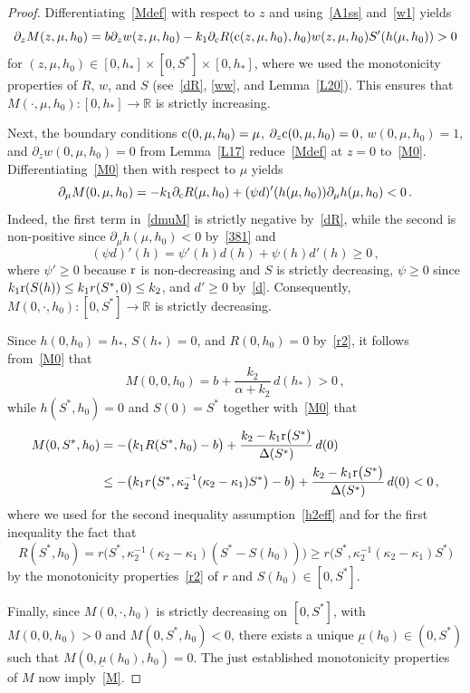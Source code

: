 \documentclass[reqno,11pt]{amsart}
\numberwithin{equation}{section}
\newcommand{\R}{\mathbb{R}}
\begin{document}
\begin{proof}
Differentiating~\eqref{Mdef} with respect to $z$ and using~\eqref{A1ss} and~\eqref{w1} yields
\begin{equation}\label{dzM}
\partial_z M(z,\mu,h_0)=b\partial_z w(z,\mu,h_0)-k_1\partial_{\rm c} R({\rm c}(z,\mu,h_0),h_0)w(z,\mu,h_0)S'(h(\mu,h_0))>0
\end{equation}
for $(z,\mu,h_0)\in [0,h_*]\times [0,S^*]\times [0,h_*]$, where we used the monotonicity properties of $R$, $w$, and $S$ (see~\eqref{dR}, \eqref{ww}, and Lemma~\ref{L20}). This ensures that \mbox{$M(\cdot,\mu,h_0):[0,h_*]\to \R$} is strictly increasing.

Next, the boundary conditions ${\rm c}(0,\mu,h_0)=\mu$, $\partial_z{\rm c}(0,\mu,h_0)=0$, $w(0,\mu,h_0)=1$, and $\partial_z w(0,\mu,h_0)=0$ from Lemma~\ref{L17} reduce~\eqref{Mdef} at $z=0$ to~\eqref{M0}.
Differentiating~\eqref{M0} then with respect to $\mu$  yields
\begin{equation}\label{dmuM}
\partial_\mu M(0,\mu,h_0)=-k_1\partial_{\rm c} R(\mu,h_0)+(\psi d)'(h(\mu,h_0))\partial_\mu h(\mu,h_0)<0\,.
\end{equation}
Indeed, the first term in~\eqref{dmuM} is strictly negative by~\eqref{dR}, while the second is non-positive since $\partial_\mu h(\mu,h_0)<0$ by~\eqref{381} and
\[
(\psi d)'(h)=\psi'(h)d(h)+\psi(h)d'(h)\ge 0\,,
\]
where $\psi'\geq 0$ because $\rm r$ is non-decreasing and $S$ is strictly decreasing, $\psi\ge 0$ since $k_1{\rm r}(S(h))\le k_1 r(S^*,0)\le k_2$, and $d'\ge 0$  by~\eqref{d}. Consequently, $M(0,\cdot,h_0):[0,S^*]\to \R$ is strictly decreasing.

Since $h(0,h_0)=h_*$, $S(h_*)=0$, and
$R(0,h_0)=0$
by~\eqref{r2}, it follows from~\eqref{M0} that
\[
M(0,0,h_0)=b+\frac{k_2}{\alpha+k_2}\,d(h_*)>0\,,
\]
while $h(S^*,h_0)=0$ and $S(0)=S^*$ together with~\eqref{M0} that
\begin{align*}
M(0,S^*,h_0)&=-\big(k_1 R(S^*,h_0)-b\big)+\frac{k_2-k_1{\rm r}\big(S^*\big)}{\Delta(S^*)}\,d(0)\\
&\le -\big(k_1 r\big(S^*,\kappa_2^{-1}(\kappa_2-\kappa_1)S^*\big)-b\big)+\frac{k_2-k_1{\rm r}\big(S^*\big)}{\Delta(S^*)}\,d(0)<0\,,
\end{align*}
where we used for the second inequality assumption~\eqref{h2eff} and for the first inequality the fact that
$$
R(S^*,h_0)=r\big(S^*,\kappa_2^{-1}(\kappa_2-\kappa_1)(S^*-S(h_0))\big)\ge r\big(S^*,\kappa_2^{-1}(\kappa_2-\kappa_1)S^*\big)
$$
by the monotonicity properties~\eqref{r2} of $r$ and $S(h_0)\in [0,S^*]$.

Finally, since $M(0,\cdot,h_0)$ is strictly decreasing on $[0,S^*]$, with $M(0,0,h_0)>0$ and $M(0,S^*,h_0)<0$, there exists a unique $\underline\mu(h_0)\in(0,S^*)$ such that $M(0,\underline\mu(h_0),h_0)=0$. The just established monotonicity properties of $M$ now imply~\eqref{M}.
\end{proof}
\end{document}
